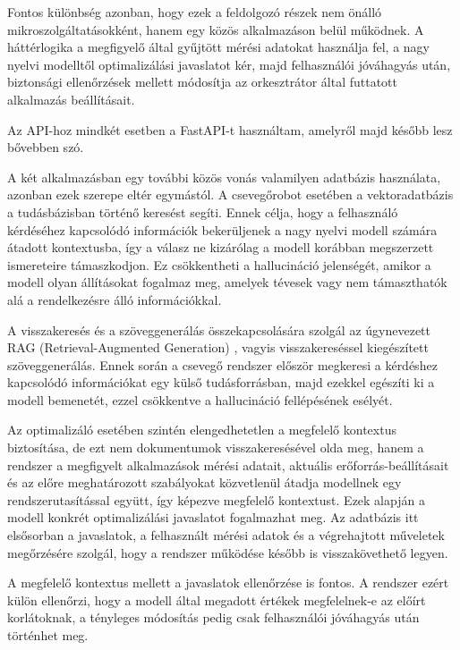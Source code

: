 Fontos különbség azonban, hogy ezek a feldolgozó részek nem önálló mikroszolgáltatásokként,
hanem egy közös alkalmazáson belül működnek.
A háttérlogika a megfigyelő által gyűjtött mérési adatokat használja fel,
a nagy nyelvi modelltől optimalizálási javaslatot kér, majd felhasználói jóváhagyás után, 
biztonsági ellenőrzések mellett módosítja az orkesztrátor által futtatott alkalmazás
beállításait.

Az API-hoz mindkét esetben a FastAPI-t használtam, amelyről majd később lesz bővebben szó.

A két alkalmazásban egy további közös vonás valamilyen adatbázis használata,
azonban ezek szerepe eltér egymástól. A csevegőrobot esetében a vektoradatbázis a
tudásbázisban történő keresést segíti. Ennek célja, hogy a felhasználó kérdéséhez
kapcsolódó információk bekerüljenek a nagy nyelvi modell számára átadott kontextusba, 
így a válasz ne kizárólag a modell korábban megszerzett ismereteire támaszkodjon. 
Ez csökkentheti a hallucináció jelenségét, amikor a modell olyan állításokat fogalmaz meg,
amelyek tévesek vagy nem támaszthatók alá a rendelkezésre álló információkkal.

A visszakeresés és a szöveggenerálás összekapcsolására szolgál az úgynevezett
RAG (Retrieval-Augmented Generation) \cite{NEURIPS2020_6b493230}, vagyis visszakereséssel kiegészített szöveggenerálás.
Ennek során a csevegő rendszer először megkeresi a kérdéshez kapcsolódó információkat egy külső
tudásforrásban, majd ezekkel egészíti ki a modell bemenetét, ezzel csökkentve a hallucináció
fellépésének esélyét. 

Az optimalizáló esetében szintén elengedhetetlen a megfelelő kontextus biztosítása,
de ezt nem dokumentumok visszakeresésével olda meg, hanem a rendszer a megfigyelt
alkalmazások mérési adatait, aktuális erőforrás-beállításait és az előre meghatározott
szabályokat közvetlenül átadja modellnek egy rendszerutasítással együtt, így képezve megfelelő kontextust.
Ezek alapján a modell konkrét optimalizálási javaslatot fogalmazhat meg.
Az adatbázis itt elsősorban a javaslatok, a felhasznált mérési
adatok és a végrehajtott műveletek megőrzésére szolgál, hogy a rendszer működése később is
visszakövethető legyen.

A megfelelő kontextus mellett a javaslatok ellenőrzése is fontos. A rendszer ezért külön
ellenőrzi, hogy a modell által megadott értékek megfelelnek-e az előírt korlátoknak,
a tényleges módosítás pedig csak felhasználói jóváhagyás után történhet meg.
